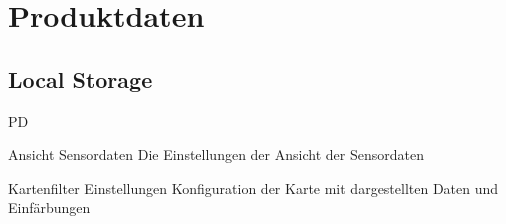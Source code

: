 \section{Produktdaten}

\subsection{Local Storage}
\begin{Kriterien}{PD}
 \item[Ansicht Sensordaten]
    Die Einstellungen der Ansicht der Sensordaten

 \item[Kartenfilter Einstellungen]
    Konfiguration der Karte mit dargestellten Daten und Einfärbungen

\end{Kriterien}